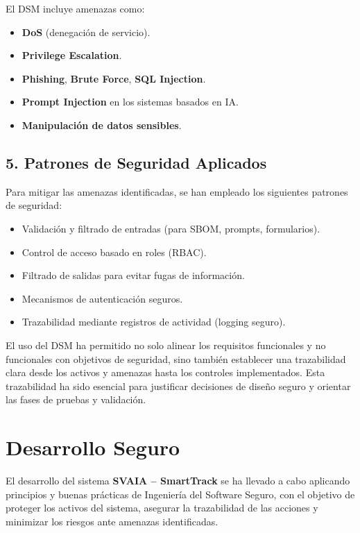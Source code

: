\documentclass[11pt]{article}
\begin{document}
El DSM incluye amenazas como:

\begin{itemize}
    \item \textbf{DoS} (denegación de servicio).
    \item \textbf{Privilege Escalation}.
    \item \textbf{Phishing}, \textbf{Brute Force}, \textbf{SQL Injection}.
    \item \textbf{Prompt Injection} en los sistemas basados en IA.
    \item \textbf{Manipulación de datos sensibles}.
\end{itemize}

\subsection*{5. Patrones de Seguridad Aplicados}

Para mitigar las amenazas identificadas, se han empleado los siguientes patrones de seguridad:

\begin{itemize}
    \item Validación y filtrado de entradas (para SBOM, prompts, formularios).
    \item Control de acceso basado en roles (RBAC).
    \item Filtrado de salidas para evitar fugas de información.
    \item Mecanismos de autenticación seguros.
    \item Trazabilidad mediante registros de actividad (logging seguro).
\end{itemize}

El uso del DSM ha permitido no solo alinear los requisitos funcionales y no funcionales con objetivos de seguridad, sino también establecer una trazabilidad clara desde los activos y amenazas hasta los controles implementados. Esta trazabilidad ha sido esencial para justificar decisiones de diseño seguro y orientar las fases de pruebas y validación.

\section{Desarrollo Seguro}

El desarrollo del sistema \textbf{SVAIA – SmartTrack} se ha llevado a cabo aplicando principios y buenas prácticas de Ingeniería del Software Seguro, con el objetivo de proteger los activos del sistema, asegurar la trazabilidad de las acciones y minimizar los riesgos ante amenazas identificadas.
\end{document}
